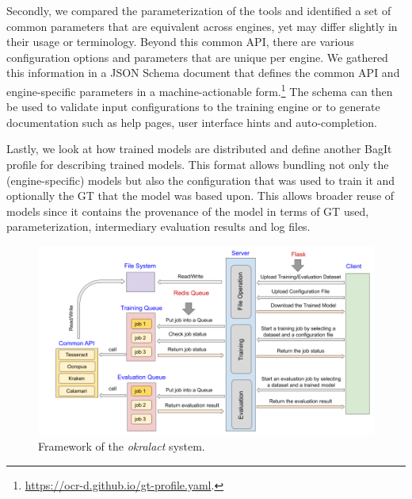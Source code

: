 \documentclass[conference]{IEEEtran}
\begin{document}
Secondly, we compared the parameterization of the tools and
identified a set of common parameters that are equivalent across
engines, yet may differ slightly in their usage or terminology.
Beyond this common API, there are various configuration options and
parameters that are unique per engine. We gathered this information
in a JSON Schema document that defines the common API and
engine-specific parameters in a machine-actionable
form.\footnote{\url{https://ocr-d.github.io/gt-profile.yaml}.} The
schema can then be used to validate input configurations to the
training engine or to generate documentation such as help pages,
user interface hints and auto-completion.

Lastly, we look at how trained models are distributed and
define another BagIt profile for describing trained models. This
format allows bundling not only the (engine-specific) models but
also the configuration that was used to train it and optionally the
GT that the model was based upon. 
This allows broader reuse of models
since it contains the provenance of the model in terms of GT used,
parameterization, intermediary evaluation results and log files.


\begin{figure}[ht!]
    \begin{center}
        \includegraphics[width=1\linewidth]{Figures/Framework.png}
    \end{center}
    \caption{Framework of the \textit{okralact} system.}
    \label{fig:framework}
\end{figure}
\end{document}

